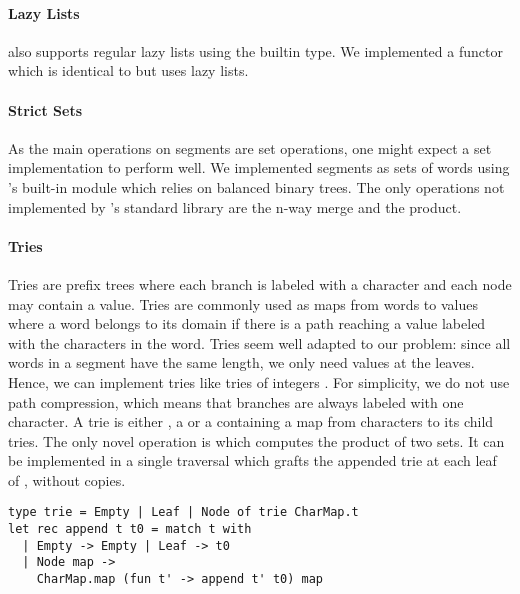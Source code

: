\paragraph{Lazy Lists}

\ocaml also supports regular lazy lists using the builtin  type.
%
%
We implemented a  functor which is identical to
 but uses lazy lists.

\paragraph{Strict Sets}

As the main operations on segments are set operations, one might 
expect a set implementation to perform well. We implemented segments as sets
of words using \ocaml's built-in  module which relies on
balanced binary trees.
The only operations not implemented by \ocaml's standard library are
the n-way merge and the product.

\paragraph{Tries}

Tries \cite{Fredkin1960} are prefix trees where each branch is labeled
with a character and each node may contain a value. Tries are commonly used
as maps from words to values where a word belongs to its domain if there is a
path reaching a value labeled with the characters in the word.
Tries seem well adapted to our problem:
since all words in a segment have the same length, we only need values at the leaves.
%
Hence, we can implement tries like tries of integers \cite{Okasaki98fastmergeable}.
For simplicity, we do not use path compression, which means
that branches are always labeled with one character.
A trie is either , a  or a  containing a map from characters
to its child tries.
%
The only novel operation is  which computes the product of two sets.
It can be implemented in a single traversal which grafts the
appended trie  at each leaf of , without copies.

\begin{lstlisting}
type trie = Empty | Leaf | Node of trie CharMap.t
let rec append t t0 = match t with
  | Empty -> Empty | Leaf -> t0
  | Node map -> 
    CharMap.map (fun t' -> append t' t0) map
\end{lstlisting}

